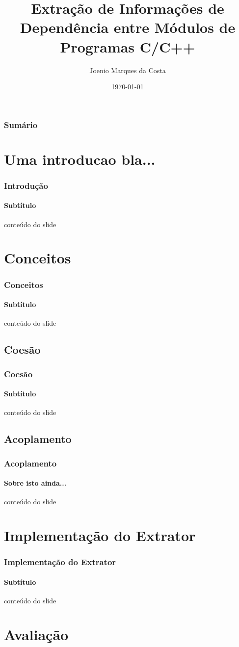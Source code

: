 \documentclass{beamer}
\title[Extração de Informações de Dependência entre Módulos de Programas C/C++]{Extração de Informações de Dependência entre Módulos de Programas C/C++}
\author[Joenio Costa]{Joenio Marques da Costa}
\institute{UCSal - Universidade Católica do Salvador}
\date{\today}
\begin{document}
\frame{\titlepage} %

\begin{frame}
 \frametitle{Sumário}
 \tableofcontents
\end{frame}

\section[Introdução]{Uma introducao bla...}

\begin{frame}
\frametitle{Introdução}
\framesubtitle{Subtítulo}
 conteúdo do slide
\end{frame}

\section{Conceitos}

\begin{frame}
\frametitle{Conceitos}
\framesubtitle{Subtítulo}
 conteúdo do slide
\end{frame}

\subsection{Coesão}

\begin{frame}
\frametitle{Coesão}
\framesubtitle{Subtítulo}
 conteúdo do slide
\end{frame}

\subsection{Acoplamento}

\begin{frame}
\frametitle{Acoplamento}
\framesubtitle{Sobre isto ainda...}
 conteúdo do slide
\end{frame}

\section{Implementação do Extrator}

\begin{frame}
\frametitle{Implementação do Extrator}
\framesubtitle{Subtítulo}
 conteúdo do slide
\end{frame}

\section{Avaliação}
\end{document}
